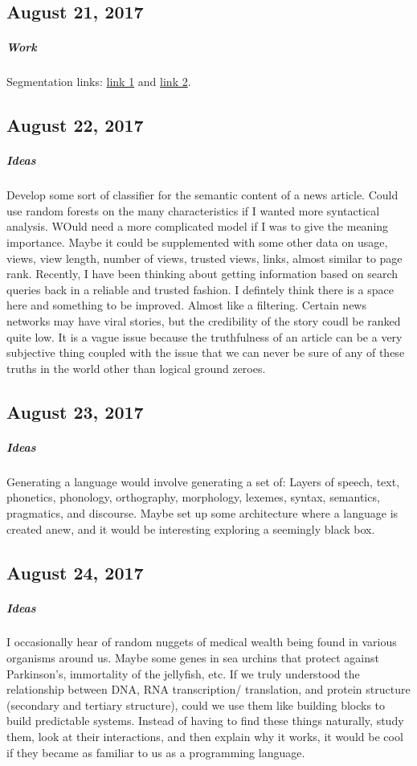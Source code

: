 \documentclass[a4paper]{article}
\begin{document}
\subsection{August 21, 2017}
\subparagraph{Work}
Segmentation links: \href{https://github.com/vuptran/cardiac-segmentation}{link 1} and \href{https://github.com/naldeborgh7575/brain_segmentation}{link 2}.

\subsection{August 22, 2017}
\subparagraph{Ideas}
Develop some sort of classifier for the semantic content of a news article. Could use random forests on the many characteristics if I wanted more syntactical analysis. WOuld need a more complicated model if I was to give the meaning importance. Maybe it could be supplemented with some other data on usage, views, view length, number of views, trusted views, links, almost similar to page rank.
Recently, I have been thinking about getting information based on search queries back in a reliable and trusted fashion. I defintely think there is a space here and something to be improved. Almost like a filtering. Certain news networks may have viral stories, but the credibility of the story coudl be ranked quite low. It is a vague issue because the truthfulness of an article can be a very subjective thing coupled with the issue that we can never be sure of any of these truths in the world other than logical ground zeroes.

\subsection{August 23, 2017}
\subparagraph{Ideas}
Generating a language would involve generating a set of: Layers of speech, text, phonetics, phonology, orthography, morphology, lexemes, syntax, semantics, pragmatics, and discourse. Maybe set up some architecture where a language is created anew, and it would be interesting exploring a seemingly black box.

\subsection{August 24, 2017}
\subparagraph{Ideas}
I occasionally hear of random nuggets of medical wealth being found in various organisms around us. Maybe some genes in sea urchins that protect against Parkinson's, immortality of the jellyfish, etc. If we truly understood the relationship between DNA, RNA transcription/ translation, and protein structure (secondary and tertiary structure), could we use them like building blocks to build predictable systems. Instead of having to find these things naturally, study them, look at their interactions, and then explain why it works, it would be cool if they became as familiar to us as a programming language.
\end{document}

